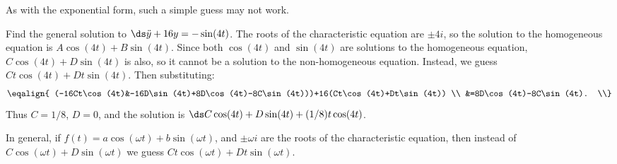 As with the exponential form, such a simple guess may not work.

\begin{example} Find the general solution to $\ds\ddot y+16y=-\sin(4t)$. 
The roots of the characteristic equation are $\pm4i$, so the
solution to the homogeneous equation is $A\cos(4t)+B\sin(4t)$. Since
both $\cos(4t)$ and $\sin(4t)$ are solutions to the homogeneous
equation,  $C\cos(4t)+D\sin(4t)$ is also, so it cannot be a solution
to the non-homogeneous equation. Instead, we guess
$Ct\cos(4t)+Dt\sin(4t)$. Then substituting:
$$\eqalign{
(-16Ct\cos(4t)&-16D\sin(4t)+8D\cos(4t)-8C\sin(4t)))+16(Ct\cos(4t)+Dt\sin(4t)) \\
&=8D\cos(4t)-8C\sin(4t). \\}
$$
Thus $C=1/8$, $D=0$, and the solution is
$\ds C\cos(4t)+D\sin(4t)+(1/8)t\cos(4t)$.
\end{example}

In general, if $f(t)=a\cos(\omega t)+b\sin(\omega t)$, and $\pm \omega
i$ are the roots of the characteristic equation, then instead of 
$C\cos(\omega t)+D\sin(\omega t)$ we guess $Ct\cos(\omega t)+Dt\sin(\omega t)$.

